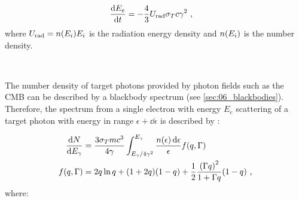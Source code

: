 \begin{equation}
    \begin{aligned}
    \dv{E_e}{t}&=-\frac{4}{3}U_\text{rad}\sigma_T c\gamma^2 \text{ ,}
    \end{aligned}   \label{eq:chapter_1_non_thermal_IC_e_energy_lost}
\end{equation}
\noindent where $U_\text{rad}=n\qty(E_i)E_i$ is the radiation energy density and $n\qty(E_i)$ is the number density.
\par~\par
The number density of target photons provided by photon fields such as the CMB can be described by a blackbody spectrum (see \autoref{sec:06_blackbodies}). Therefore, the spectrum from a single electron with energy $E_e$ scattering of a target photon with energy in range $\epsilon + \dd{\epsilon}$ is described by \citep{RevModPhys.42.237}:

\begin{equation}
    \begin{aligned}
        \frac{\dd{N}}{\dd{E_\gamma}}&=\frac{3\sigma_T mc^3}{4\gamma}\int_{E_\gamma/4\gamma^2}^{E_\gamma}\frac{n\qty(\epsilon)\dd{\epsilon}}{\epsilon}f\qty(q,\Gamma) \\
        f\qty(q,\Gamma)&=2q\ln q +\qty(1+2q)\qty(1-q)+\frac{1}{2}\frac{\qty(\Gamma q)^2}{1+\Gamma q}\qty(1-q)\text{ ,}
    \end{aligned} \label{eq:01_nonthermal_IC_indiv_spectral}
\end{equation}
\noindent where:


